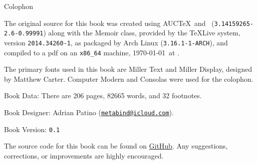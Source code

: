 
\cleartoverso
\pagestyle{empty}

\newlength{\colophon}
\calccentering{\colophon}
\begin{adjustwidth*}{\colophon}{\colophon}

\begin{flushleft}
\setlength{\parskip}{1.5\baselineskip}
{\large Colophon}

The original source for this book was created using AUC\TeX\ and
\XeLaTeX\ (\texttt{3.14159265-2.6-0.99991}) along with the Memoir
class, provided by the \TeX Live system, version
\texttt{2014.34260-1}, as packaged by Arch Linux
(\texttt{3.16.1-1-ARCH}), and compiled to a pdf on an
\texttt{x86\_64} machine, \today\ at \printtime*.

The primary fonts used in this book are Miller Text and Miller
Display, designed by Matthew Carter.  Computer Modern and Consolas
were used for the colophon.

Book Data: There are 206 pages, 82665 words, and 32 footnotes. 

Book Designer: Adrian Patino
(\href{mailto:metabind@icloud.com}{\texttt{metabind@icloud.com}}).

Book Version: \texttt{0.1}

The source code for this book can be found on
\href{https://github.com/metabind/spirit-hazlitt}{GitHub}.  Any
suggestions, corrections, or improvements are highly encouraged.


\end{flushleft}
\end{adjustwidth*}
